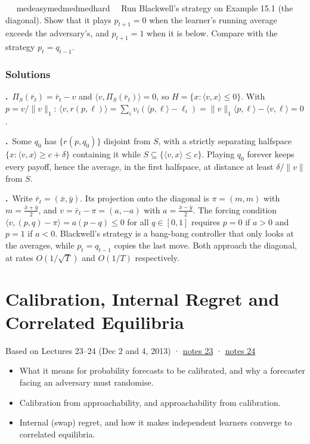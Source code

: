 \documentclass[11pt,a4paper,openany]{book}
\newcommand{\ip}[2]{\langle #1,#2\rangle}
\newcommand{\norm}[1]{\lVert #1\rVert}
\newcommand{\chapsource}[1]{{\small\sffamily\color{muted}#1\par}\medskip}
\newcommand{\extag}[2]{%
  \def\tmp{#1}\def\tmpE{easy}\def\tmpM{med}\def\tmpH{hard}%
  \ifx\tmp\tmpE\def\tagc{defc}\else\ifx\tmp\tmpM\def\tagc{thmc}\else\ifx\tmp\tmpH\def\tagc{warnc}\else\def\tagc{finc}\fi\fi\fi
  \tcbox[on line,boxrule=0pt,arc=2pt,colback=\tagc!12,left=2pt,right=2pt,top=0pt,bottom=0pt,boxsep=1pt]{\sffamily\scriptsize\bfseries\color{\tagc}#2}}
\newcommand{\exercise}[3]{\par\medskip\noindent\textbf{\sffamily #1}\ \ #2\ \ #3\par}
\newenvironment{solutions}{\small}{}
\newcommand{\sol}[2]{\par\smallskip\noindent\textbf{\sffamily #1.}\ #2\par}
\begin{document}
\exercise{15.3}{\extag{med}{core}}{\hypertarget{sol-15.3}{}Run Blackwell's strategy on Example 15.1 (the diagonal). Show that it plays $p_{t+1}=0$ when the learner's running average exceeds the adversary's, and $p_{t+1}=1$ when it is below. Compare with the strategy $p_t=q_{t-1}$.}

\subsection*{Solutions}
\begin{solutions}
\sol{15.1}{$\Pi_S(\bar r_t)=\bar r_t-v$ and $\ip{v}{\Pi_S(\bar r_t)}=0$, so $H=\{x:\ip vx\le0\}$. With $p=v/\norm v_1$: $\ip{v}{r(p,\ell)}=\sum_iv_i(\ip p\ell-\ell_i)=\norm v_1\ip p\ell-\ip v\ell=0$.}
\sol{15.2}{Some $q_0$ has $\{r(p,q_0)\}$ disjoint from $S$, with a strictly separating halfspace $\{x:\ip vx\ge c+\delta\}$ containing it while $S\subseteq\{\ip vx\le c\}$. Playing $q_0$ forever keeps every payoff, hence the average, in the first halfspace, at distance at least $\delta/\norm v$ from $S$.}
\sol{15.3}{Write $\bar r_t=(\bar x,\bar y)$. Its projection onto the diagonal is $\pi=(m,m)$ with $m=\frac{\bar x+\bar y}2$, and $v=\bar r_t-\pi=(a,-a)$ with $a=\frac{\bar x-\bar y}2$. The forcing condition $\ip{v}{(p,q)-\pi}=a(p-q)\le0$ for all $q\in[0,1]$ requires $p=0$ if $a>0$ and $p=1$ if $a<0$. Blackwell's strategy is a bang-bang controller that only looks at the averages, while $p_t=q_{t-1}$ copies the last move. Both approach the diagonal, at rates $O(1/\sqrt T)$ and $O(1/T)$ respectively.}
\end{solutions}

\chapter[Calibration and correlated equilibria]{Calibration, Internal Regret and Correlated Equilibria}\label{ch16}
\chapsource{Based on Lectures 23–24 (Dec 2 and 4, 2013) · \href{https://web.eecs.umich.edu/~jabernet/eecs598course/fall2013/web/notes/lec23_120213.pdf}{notes 23} · \href{https://web.eecs.umich.edu/~jabernet/eecs598course/fall2013/web/notes/lec24_120413.pdf}{notes 24}}

\begin{goals}
\begin{itemize}
\item What it means for probability forecasts to be calibrated, and why a forecaster facing an adversary must randomise.
\item Calibration from approachability, and approachability from calibration.
\item Internal (swap) regret, and how it makes independent learners converge to correlated equilibria.
\end{itemize}
\end{goals}
\end{document}
